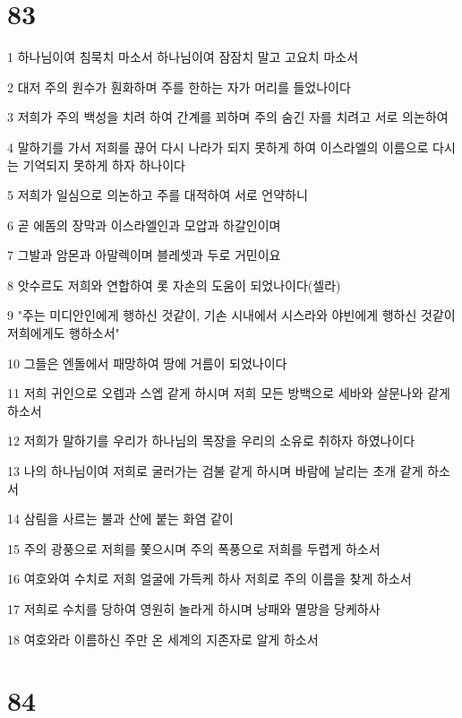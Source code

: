 \chapter{83}

\par 1 하나님이여 침묵치 마소서 하나님이여 잠잠치 말고 고요치 마소서
\par 2 대저 주의 원수가 훤화하며 주를 한하는 자가 머리를 들었나이다
\par 3 저희가 주의 백성을 치려 하여 간계를 꾀하며 주의 숨긴 자를 치려고 서로 의논하여
\par 4 말하기를 가서 저희를 끊어 다시 나라가 되지 못하게 하여 이스라엘의 이름으로 다시는 기억되지 못하게 하자 하나이다
\par 5 저희가 일심으로 의논하고 주를 대적하여 서로 언약하니
\par 6 곧 에돔의 장막과 이스라엘인과 모압과 하갈인이며
\par 7 그발과 암몬과 아말렉이며 블레셋과 두로 거민이요
\par 8 앗수르도 저희와 연합하여 롯 자손의 도움이 되었나이다(셀라)
\par 9 "주는 미디안인에게 행하신 것같이, 기손 시내에서 시스라와 야빈에게 행하신 것같이 저희에게도 행하소서"
\par 10 그들은 엔돌에서 패망하여 땅에 거름이 되었나이다
\par 11 저희 귀인으로 오렙과 스엡 같게 하시며 저희 모든 방백으로 세바와 살문나와 같게 하소서
\par 12 저희가 말하기를 우리가 하나님의 목장을 우리의 소유로 취하자 하였나이다
\par 13 나의 하나님이여 저희로 굴러가는 검불 같게 하시며 바람에 날리는 초개 같게 하소서
\par 14 삼림을 사르는 불과 산에 붙는 화염 같이
\par 15 주의 광풍으로 저희를 쫓으시며 주의 폭풍으로 저희를 두렵게 하소서
\par 16 여호와여 수치로 저희 얼굴에 가득케 하사 저희로 주의 이름을 찾게 하소서
\par 17 저희로 수치를 당하여 영원히 놀라게 하시며 낭패와 멸망을 당케하사
\par 18 여호와라 이름하신 주만 온 세계의 지존자로 알게 하소서

\chapter{84}


